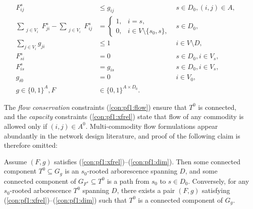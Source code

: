 \begin{subequations}
\begin{align}
\label{con:pf1:xfrel} F^{s}_{ij} & \leq g_{ij} & s\in D_0, (i,j)\in A, \\
\label{con:pf1:flow} \sum\limits_{\substack{ j \in V_i }}F^{s}_{ji}-\sum\limits_{\substack{j\in V_i}}F^{s}_{ij} &= 
  \begin{cases}
    1, & i=s,\\
    0, & i\in V\setminus \{s_0, s\},
  \end{cases} & s\in D_0,\\
\label{con:pf1:B}  \sum_{j\in V_i}g_{ji}&\leq 1 & i\in V\setminus D,\\
\label{con:pf1:noflowFromT} F_{si}^s&=0 & s\in D_0, i\in V_s,\\
\label{con:pf1:fitt=xit} F_{is}^s&=g_{is} & s\in D_0, i\in V_s,\\
\label{con:pf1:xi0=0} g_{i0}&=0 & i\in V_0,\\
\label{con:pf1:dim}g \in \{0,1\}^{A},F&\in\{0,1\}^{A \times D_0}.
\end{align}~
\end{subequations}

The \emph{flow conservation} constraints (\ref{con:pf1:flow}) ensure that $T^0$ is connected,
and the \emph{capacity} constraints (\ref{con:pf1:xfrel}) state that flow of any commodity is allowed only if $(i,j)\in A^0$.
Multi-commodity flow formulations appear abundantly in the network design literature, and proof of the following claim is therefore omitted:

\begin{lemma}
\label{lem:modelcorrect}
Assume $(F,g)$ satisfies (\ref{con:pf1:xfrel})--(\ref{con:pf1:dim}).
Then some connected component $T^0\subseteq G_{g}$ is an $s_0$-rooted arborescence spanning $D$,
and some connected component of $G_{F^s}\subseteq T^0$ is a path from $s_0$ to $s\in D_0$.
Conversely, for any $s_0$-rooted arborescence $T^0$ spanning $D$, there exists a pair $(F,g)$ satisfying (\ref{con:pf1:xfrel})--(\ref{con:pf1:dim}) such that $T^0$
is a connected component of $G_g$.
\end{lemma}
 
